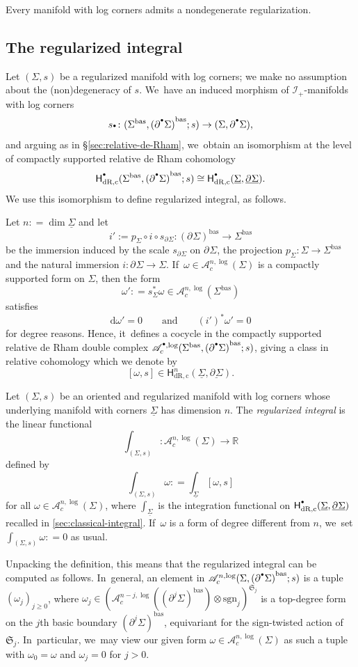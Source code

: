 \documentclass[10pt]{amsart}
\let\oldbullet\bullet
\renewcommand{\bullet}{{\raisebox{1pt}{$\scriptscriptstyle\oldbullet$}}}
\theoremstyle{definition}
\theoremstyle{remark}
\let\defn\emph
\newcommand{\RR}{\mathbb{R}}
\renewcommand{\ge}{\geqslant}
\newcommand{\defas}{\mathrel{\mathop:}=}
\newcommand{\dd}{\mathrm{d}}
\newcommand{\Alogc}[2][\bullet]{\mathscr{A}^{#1,\log}_c(#2)}
\newcommand{\Sig}{\Sigma}
\newcommand{\uSig}{\underline{\Sigma}}
\newcommand{\bas}[1]{{#1}^{\mathrm{bas}}}
\newcommand{\Sigbas}{\bas{\Sig}}
\newcommand{\ubdSig}[1][]{\underline{\partial^{#1}\Sigma}}
\newcommand{\bdSig}[1][]{\partial^{#1}\Sigma}
\newcommand{\HdRc}[2][\bullet]{\mathsf{H}_{\mathrm{dR},\mathrm{c}}^{#1}(#2)}
\newcommand{\symgp}[1]{\mathfrak{S}_{#1}}
\newcommand{\sgn}[1]{\mathrm{sgn}_{#1}}
\newcommand{\ascat}{\mathscr{I}_+}
\begin{document}
\begin{corollary}
Every manifold with log corners admits a nondegenerate regularization.
\end{corollary}

\subsection{The regularized integral}
Let $(\Sig,s)$ be a regularized manifold with log corners; we make no assumption about the (non)degeneracy of $s$. We~have an induced morphism of $\ascat$-manifolds with log corners
\[
s_\bullet \colon (\Sigbas,\bas{(\bdSig[\bullet])};s) \to (\Sig,\bdSig[\bullet]),
\]
and arguing as in \S\ref{sec:relative-de-Rham}, we~obtain an isomorphism at the level of compactly supported relative de Rham cohomology
\[
\HdRc{\Sigbas,\bas{(\bdSig[\bullet])};s} \cong \HdRc{\uSig,\ubdSig}.
\]
We use this isomorphism to define regularized integral, as follows.

Let $n \defas \dim \uSig$ and let
\[
i' := p_{\Sig} \circ i \circ s_{\bdSig} : \bas{(\bdSig)} \to \Sigbas
\]
be the immersion induced by the scale $s_{\bdSig}$ on $\bdSig$, the projection $p_\Sig : \Sig \to \Sigbas$ and the natural immersion $i : \bdSig \to \Sig$. If~$\omega \in \Alogc[n]{\Sig}$ is a compactly supported form on $\Sig$, then the form
\[
\omega' \defas s_\Sig^*\omega \in \Alogc[n]{\Sigbas}
\]
satisfies
\[
\dd \omega' =0 \qquad \textrm{and} \qquad (i')^*\omega'= 0
\]
for degree reasons. Hence, it~defines a cocycle in the compactly supported relative de Rham double complex $\Alogc{\Sigbas,\bas{(\bdSig[\bullet])};s}$, giving a class in relative cohomology which we denote by
\[
[\omega,s] \in \HdRc[n]{\uSig,\ubdSig}.
\]

\begin{definition}\label{def:regularized-integral}
Let $(\Sig,s)$ be an oriented and regularized manifold with log corners whose underlying manifold with corners $\uSig$ has dimension $n$. The \defn{regularized integral} is the linear functional
\[
\int_{(\Sig,s)} \colon \Alogc[n]{\Sig} \to \RR
\]
defined by
\[
\int_{(\Sig,s)} \omega \defas \int_{\uSig}[\omega,s]
\]
for all $\omega \in \Alogc[n]{\Sig}$, where $\int_{\uSig}$ is the integration functional on $\HdRc{\uSig,\ubdSig}$ recalled in \autoref{sec:classical-integral}. If~$\omega$ is a form of degree different from $n$, we~set $\int_{(\Sig,s)}\omega \defas 0$ as usual.
\end{definition}

Unpacking the definition, this means that the regularized integral can be computed as follows. In~general, an element in $\Alogc[n]{\Sig,\bas{(\bdSig[\bullet])};s}$ is a tuple $(\omega_j)_{j \ge 0}$, where $\omega_j \in (\Alogc[n-j]{\bas{(\bdSig[j])}}\otimes \sgn{j})^{\symgp{j}}$ is a top-degree form on the $j$th basic boundary $\bas{(\bdSig[j])}$, equivariant for the sign-twisted action of $\symgp{j}$. In~particular, we~may view our given form $\omega \in \Alogc[n]{\Sig}$ as such a tuple with $\omega_0 = \omega$ and $\omega_j = 0$ for $j > 0$.
\end{document}
